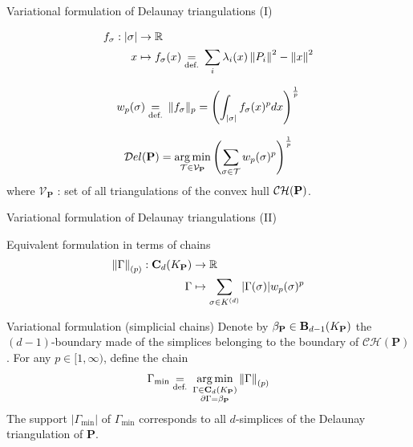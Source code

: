 \begin{frame}{Variational formulation of Delaunay triangulations (I)}
\begin{minipage}{0.65\linewidth}
		\[
		\begin{aligned}
			f_\sigma : |\sigma| &\to \mathbb{R}\\
			x  &\mapsto f_\sigma(x) \underset{\text{def.}}{=} \: \sum_i \lambda_i(x) \left\lVert P_i \right\rVert^2 - \left\lVert x \right\rVert^2
		\end{aligned}
		\]
		
		\[
		w_p(\sigma) \underset{\text{def.}}{=} \: \| f_\sigma \|_{p} =  \left(  \int_{|\sigma|} f_\sigma(x)^p dx \right)^{\frac{1}{p}}
		\]
		
		\[
		\mathcal{D}el(\mathbf{P}) = \operatorname*{arg\,min}_{\mathcal{T} \in \mathcal{V}_{\mathbf{P}}} \left(\sum_{\sigma \in \mathcal{T}} w_p(\sigma)^p \right)^{\frac{1}{p}}
		\] where $\mathcal{V}_{\mathbf{P}}$ : set of all triangulations of the convex hull $\mathcal{CH}(\mathbf{P})$.
	\end{minipage}
\end{frame}

\begin{frame}{Variational formulation of Delaunay triangulations (II)}
	\scriptsize

	Equivalent formulation in terms of chains
	\[
		\begin{aligned}
			\left\lVert  \Gamma  \right\rVert_{(p)} : \mathbf{C}_d(K_{\mathbf{P}}) &\to \mathbb{R}\\
			\Gamma &\mapsto \sum_{\sigma \in K^{(d)}} | \Gamma( \sigma)|  w_p(\sigma)^p	
		\end{aligned}
	\]
	
	\begin{block}{\scriptsize Variational formulation (simplicial chains)}
	Denote by $\beta_{\mathbf{P}} \in \mathbf{B}_{d-1}(K_{\mathbf{P}})$ the $(d-1)$-boundary made of the simplices belonging to the boundary of $\mathcal{CH}(\mathbf{P})$. For any $p\in [1, \infty)$, define the chain
	\begin{equation*}
		\Gamma_{\min} \underset{\text{def.}}{=} \: \operatorname*{arg\,min}_{\substack{\Gamma \in \mathbf{C}_{d}(K_{\mathbf{P}})\\
				\partial \Gamma = \beta_{\mathbf{P}}}} \left\lVert \Gamma \right\rVert_{(p)}
	\end{equation*}
	The support $|\Gamma_{\min}|$ of $\Gamma_{\min}$ corresponds to all $d$-simplices of the Delaunay triangulation of $\mathbf{P}$.
	\end{block}
\end{frame}

